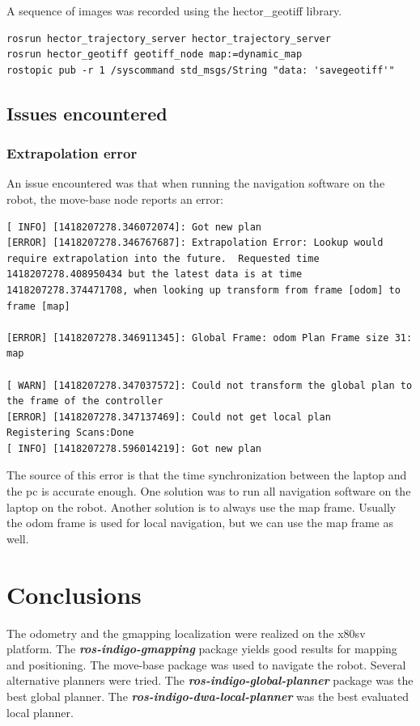\documentclass[a4paper]{article}
\newcommand{\rospackage}[1]{\textbf{\textit{ros-indigo-#1}}}
\begin{document}
A sequence of images was recorded using the hector\_geotiff library.

\begin{lstlisting}[caption=Recording the map as generated by gmapping]
rosrun hector_trajectory_server hector_trajectory_server
rosrun hector_geotiff geotiff_node map:=dynamic_map
rostopic pub -r 1 /syscommand std_msgs/String "data: 'savegeotiff'"
\end{lstlisting}


\subsection{Issues encountered}
\subsubsection{Extrapolation error}
An issue encountered was that when running the navigation software on the robot,
the move-base node reports an error:

\begin{lstlisting}[caption=Error message when running on different pc]
[ INFO] [1418207278.346072074]: Got new plan
[ERROR] [1418207278.346767687]: Extrapolation Error: Lookup would require extrapolation into the future.  Requested time 1418207278.408950434 but the latest data is at time 1418207278.374471708, when looking up transform from frame [odom] to frame [map]

[ERROR] [1418207278.346911345]: Global Frame: odom Plan Frame size 31: map

[ WARN] [1418207278.347037572]: Could not transform the global plan to the frame of the controller
[ERROR] [1418207278.347137469]: Could not get local plan
Registering Scans:Done
[ INFO] [1418207278.596014219]: Got new plan
\end{lstlisting}

The source of this error is that the time synchronization between the laptop and the pc is accurate enough.
One solution was to run all navigation software on the laptop on the robot.
Another solution is to always use the map frame. Usually the odom frame is used for local navigation,
but we can
use the map frame as well.

\section{Conclusions}
The odometry and the gmapping localization were realized on the x80sv platform.
The \rospackage{gmapping} package yields good results for mapping and positioning.
The move-base package was used to navigate the robot. Several alternative planners were
tried. The \rospackage{global-planner} package was the best global planner. The \rospackage{dwa-local-planner}
was the best evaluated local planner.
\end{document}
